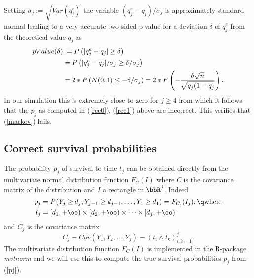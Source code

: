 Setting $\sigma_j:=\sqrt{Var(q^e_j)}$ the variable $(q^e_j-q_j)/\sigma_j$ is
approximately standard normal leading to a very accurate two sided 
p-value for a deviation $\delta$ of $q^e_j$ from the theoretical value $q_j$
as
%
\begin{align}
\notag
pValue(\delta)&:=
P\left(|q^e_j-q_j|\geq\delta\right)\\\notag&=
P\left(|q^e_j-q_j|/\sigma_j\geq\delta/\sigma_j\right)\\\label{pValue}&=
2*P\left(N(0,1)\leq-\delta/\sigma_j\right)=
2*F\left(-\frac{\delta\sqrt n}{\sqrt{q_j(1-q_j}}\right).
\end{align}
%
In our simulation this is extremely close to zero for $j\geq 4$ from which it 
follows that the $p_j$ as computed in (\ref{rec0}), (\ref{rec1}) above are incorrect.
This verifies that (\ref{markov}) fails.

\subsection{Correct survival probabilities}

The probability $p_j$ of survival to time $t_j$ can be obtained directly from the multivariate
normal distribution function $F_C(I)$ where $C$ is the covariance matrix of the distribution and
$I$ a rectangle in $\bbR^j$. Indeed
%
\begin{align}
\label{pj}
p_j&=P\big(Y_j\geq d_j,Y_{j-1}\geq d_{j-1},\dots,Y_1\geq d_1)=F_{C_j}(I_j),\q\text{where}
\\\notag
I_j&=[d_1,+\oo)\times[d_2,+\oo)\times\dots\times[d_j,+\oo)
\end{align}
%
and $C_j$ is the covariance matrix
%
\begin{equation}
\label{Cj}
C_j=Cov(Y_1,Y_2,\dots,Y_j)=(t_i\wedge t_k)_{i,k=1}^j.
\end{equation}
%
The multivariate distribution function $F_C(I)$ is implemented in the R-package \textit{mvtnorm}
and we will use this to compute the true survival probabilities $p_j$ from (\ref{pj}).



